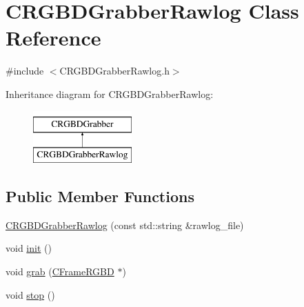 \hypertarget{class_c_r_g_b_d_grabber_rawlog}{
\section{CRGBDGrabberRawlog Class Reference}
\label{class_c_r_g_b_d_grabber_rawlog}
}


{\ttfamily \#include $<$CRGBDGrabberRawlog.h$>$}

Inheritance diagram for CRGBDGrabberRawlog:\begin{figure}[H]
\begin{center}
\leavevmode
\includegraphics[height=2.000000cm]{class_c_r_g_b_d_grabber_rawlog}
\end{center}
\end{figure}
\subsection*{Public Member Functions}
\begin{DoxyCompactItemize}
\item 
\hyperlink{class_c_r_g_b_d_grabber_rawlog_aabfd5bddf00ddb3a43d0a13280c32c24}{CRGBDGrabberRawlog} (const std::string \&rawlog\_\-file)
\item 
void \hyperlink{class_c_r_g_b_d_grabber_rawlog_abf3ace5b3c3fbc947b47a0caec76791d}{init} ()
\item 
void \hyperlink{class_c_r_g_b_d_grabber_rawlog_a22e26394c6f7d83d45c5de01a4c999b4}{grab} (\hyperlink{class_c_frame_r_g_b_d}{CFrameRGBD} $\ast$)
\item 
void \hyperlink{class_c_r_g_b_d_grabber_rawlog_af499a26d2f6a92184fcc457e9c664da3}{stop} ()
\end{DoxyCompactItemize}

